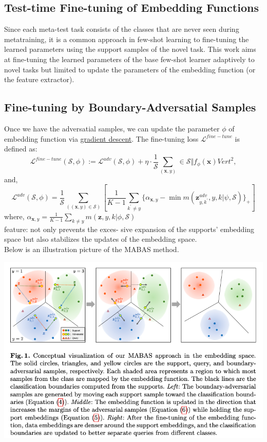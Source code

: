 \documentclass{article}
\begin{document}
\subsection{Test-time Fine-tuning of Embedding Functions}
Since each meta-test task consists of the classes that are never seen during metatraining, 
it is a common approach in few-shot learning to fine-tuning the learned parameters using the
support samples of the novel task. This work aims at fine-tuning the learned parameters of the
base few-shot learner adaptively to novel tasks but limited to update the parameters of the
embedding function (or the feature extractor). 
\subsection{Fine-tuning by Boundary-Adversatial Samples}
Once we have the adversatial samples, we can update the parameter $\phi$ of embedding function via \underline{gradient descent}. The fine-tuning loss $\mathcal{L}^{fine-tune}$ is defined as: \\
$$
\mathcal{L}^{fine-tune}(\mathcal{S}, \phi) := \mathcal{L}^{adv}(\mathcal{S}, \phi) + \eta \cdot \frac{1}{\mathcal{S}}\sum_{(\textbf{x},y)}\in\mathcal{S}{\Vert}f_{\phi}(\textbf{x}){Vert}^2,
$$
and, 
$$
\mathcal{L}^{adv}(\mathcal{S}, \phi) = 
\frac{1}{\mathcal{S}} 
\sum_((\textbf{x}, y) \in \mathcal{S})[
    \frac{1}{K - 1} \sum_{k^{\prime} \neq y} 
        \{\alpha_{\textbf{x},y} - 
        \min{
            m(\textbf{z}_{y, k^{\prime}}^{adv}, y, k | \psi, \mathcal{S})
            } 
        \}_+
    ]
$$
where,
$
\alpha_{\textbf{x}, y} =
\frac{1}{K - 1} 
\sum_{k \neq y} 
m 
(\textbf{z}, y, k 
|
\phi,
\mathcal{S}
)
$
\\
feature: not only prevents the exces- sive expansion 
of the supports’ embedding space but also stabilizes 
the updates of the embedding space.\\
Below is an illustration picture of the MABAS method.\\
\begin{center}
    \includegraphics[scale=0.4]{src/img/MABAS Illustration.jpg}\\
\end{center}
\end{document}
